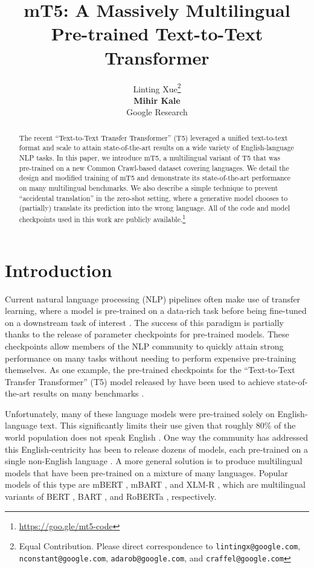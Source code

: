 \documentclass[11pt]{article}
\title{mT5: A Massively Multilingual Pre-trained Text-to-Text Transformer}
\author{Linting Xue\thanks{\hspace{0.5em}Equal Contribution. Please direct correspondence to \texttt{lintingx@google.com}, \texttt{nconstant@google.com}, \texttt{adarob@google.com}, and \texttt{craffel@google.com}} \quad {\bf Noah Constant}\footnotemark[1] \quad {\bf Adam Roberts\footnotemark[1]} \\ {\bf Mihir Kale} \quad {\bf Rami Al-Rfou} \quad {\bf Aditya Siddhant} \quad {\bf Aditya Barua} \quad {\bf
Colin Raffel} \\
Google Research}
\date{}
\begin{document}
\twocolumn
\maketitle

\begin{abstract}
The recent ``Text-to-Text Transfer Transformer'' (T5) leveraged a unified text-to-text format and scale to attain state-of-the-art results on a wide variety of English-language NLP tasks.
In this paper, we introduce mT5, a multilingual variant of T5 that was pre-trained on a new Common Crawl-based dataset covering  languages.
We detail the design and modified training of mT5 and demonstrate its state-of-the-art performance on many multilingual benchmarks.
We also describe a simple technique to prevent ``accidental translation'' in the zero-shot setting, where a generative model chooses to (partially) translate its prediction into the wrong language.
All of the code and model checkpoints used in this work are publicly available.\footnote{\label{fn:code}\url{https://goo.gle/mt5-code}}
\end{abstract}

\section{Introduction}

Current natural language processing (NLP) pipelines often make use of transfer learning, where a model is pre-trained on a data-rich task before being fine-tuned on a downstream task of interest \citep{ruder2019transfer}.
The success of this paradigm is partially thanks to the release of parameter checkpoints for pre-trained models.
These checkpoints allow members of the NLP community to quickly attain strong performance on many tasks without needing to perform expensive pre-training themselves.
As one example, the pre-trained checkpoints for the ``Text-to-Text Transfer Transformer'' (T5) model released by \citet{2020t5} have been used to achieve state-of-the-art results on many benchmarks \citep[etc.]{khashabi2020unifiedqa,roberts2020much,kale2020text,izacard2020leveraging,nogueira2020document,narang2020wt5}.

Unfortunately, many of these language models were pre-trained solely on English-language text.
This significantly limits their use given that roughly 80\% of the world population does not speak English \citep{crystal2008two}.
One way the community has addressed this English-centricity has been to release dozens of models, each pre-trained on a single non-English language \citep[etc.]{carmo2020ptt5,de2019bertje,le2019flaubert,martin2019camembert,delobelle2020robbert,malmsten2020playing,nguyen2020phobert,polignano2019alberto}.
A more general solution is to produce multilingual models that have been pre-trained on a mixture of many languages.
Popular models of this type are mBERT \citep{devlin2018multilingual}, mBART \citep{liu2020multilingual}, and \mbox{XLM-R} \citep{conneau2019unsupervised}, which are multilingual variants of BERT \citep{devlin2018bert}, BART \citep{lewis2019bart}, and RoBERTa \citep{liu2019roberta}, respectively.
\end{document}
